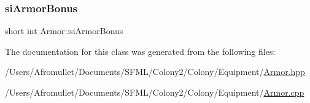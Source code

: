\mbox{\label{class_armor_a2ebccb72313c650ec1b8bafec4e82dc2}} 
\subsubsection{\texorpdfstring{si\+Armor\+Bonus}{siArmorBonus}}
{\footnotesize\ttfamily short int Armor\+::si\+Armor\+Bonus\hspace{0.3cm}{\ttfamily [private]}}



The documentation for this class was generated from the following files\+:\begin{DoxyCompactItemize}
\item 
/\+Users/\+Afromullet/\+Documents/\+S\+F\+M\+L/\+Colony2/\+Colony/\+Equipment/\mbox{\hyperlink{_armor_8hpp}{Armor.\+hpp}}\item 
/\+Users/\+Afromullet/\+Documents/\+S\+F\+M\+L/\+Colony2/\+Colony/\+Equipment/\mbox{\hyperlink{_armor_8cpp}{Armor.\+cpp}}\end{DoxyCompactItemize}
